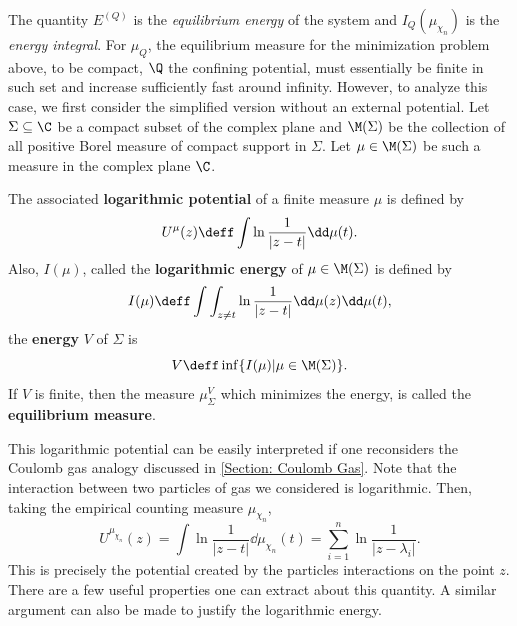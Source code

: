 The quantity $E^{(Q)}$ is the \textit{equilibrium energy} of the system and $I_Q(\mu_{\chi_n})$ is the \textit{energy integral}. For $\mu_Q$, the equilibrium measure for the minimization problem above, to be compact, $\Q$ the confining potential, must essentially be finite in such set and increase sufficiently fast around infinity. However, to analyze this case, we first consider the simplified version without an external potential. Let $\Sigma \subseteq \C$ be a compact subset of the complex plane and $\M(\Sigma)$ be the collection of all positive Borel measure of compact support in $\Sigma$. Let $\mu \in \M(\Sigma)$ be such a measure in the complex plane $\C$.
\begin{definicao}
	 The associated \textbf{logarithmic potential} of a finite measure $\mu$ is defined by 
	\begin{equation}
		U^{\mu}(z) \deff \int \ln \frac{1}{|z - t|} \dd \mu(t).
	\end{equation}
	Also, $I(\mu)$, called the \textbf{logarithmic energy} of $\mu \in \M(\Sigma)$ is defined by
	\begin{equation}
		I(\mu) \deff \int \int_{z \neq t} \ln \frac{1}{|z-t|} \dd \mu(z) \dd \mu (t),
	\end{equation}
	the \textbf{energy} $V$ of $\Sigma$ is
	\begin{equation}
		V \deff \inf\{ I(\mu) | \mu \in \M(\Sigma)\}.
	\end{equation}
	If $V$ is finite, then the measure $\mu^V_\Sigma$ which minimizes the energy, is called the \textbf{equilibrium measure}.
\end{definicao}

This logarithmic potential can be easily interpreted if one reconsiders the Coulomb gas analogy discussed in \autoref{Section: Coulomb Gas}. Note that the interaction between two particles of gas we considered is logarithmic. Then, taking the empirical counting measure $\mu_{\chi_n}$,
\begin{equation}
	U^{	\mu_{\chi_n}}(z) = \int \ln \frac{1}{|z - t|} \dd \mu_{\chi_n}(t) = \sum_{i=1}^n \ln \frac{1}{|z  - \lambda_i|}.
\end{equation}
This is precisely the potential created by the particles interactions on the point $z$. There are a few useful properties one can extract about this quantity. A similar argument can also be made to justify the logarithmic energy. 

